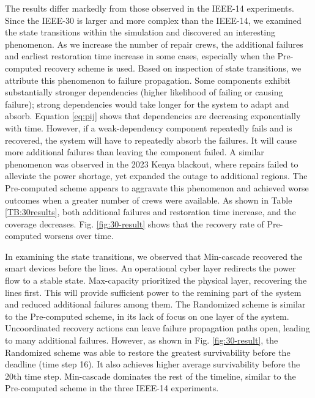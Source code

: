 \documentclass[conference]{IEEEtran}
\begin{document}
The results differ markedly from those observed in the IEEE-14 experiments. Since the IEEE-30 is larger and more complex than the IEEE-14, we examined the state transitions within the simulation and discovered an interesting phenomenon. As we increase the number of repair crews, the additional failures and earliest restoration time increase in some cases,  especially when the Pre-computed recovery scheme is used. Based on inspection of state transitions, we attribute this phenomenon to failure propagation. Some components exhibit substantially stronger dependencies (higher likelihood of failing or causing failure); strong dependencies would take longer for the system to adapt and absorb. Equation \ref{eq:pij} shows that dependencies are decreasing exponentially with time. However, if a weak-dependency component repeatedly fails and is recovered, the system will have to repeatedly absorb the failures. It will cause more additional failures than leaving the component failed. A similar phenomenon was observed in the 2023 Kenya blackout, where repairs failed to alleviate the power shortage, yet expanded the outage to additional regions. The Pre-computed scheme appears to aggravate this phenomenon and achieved worse outcomes when a greater number of crews were available. As shown in Table \ref{TB:30results}, both additional failures and restoration time increase, and the coverage decreases. Fig.  \ref{fig:30-result} shows that the recovery rate of Pre-computed  worsens over time. 


In examining the state transitions, we observed that Min-cascade recovered the smart devices before the lines. An operational cyber layer redirects the power flow to a stable state. Max-capacity prioritized the physical layer, recovering the lines first. This will provide sufficient power to the remining part of the system and reduced additional failures among them. The Randomized scheme is similar to the Pre-computed scheme, in its lack of focus on one layer of the system. Uncoordinated recovery actions can leave failure propagation paths open, leading to many additional failures. However, as shown in Fig.  \ref{fig:30-result}, the Randomized scheme was able to restore the greatest survivability before the deadline (time step 16). It also achieves higher average survivability before the 20th time step. Min-cascade dominates the rest of the timeline, similar to the Pre-computed scheme in the three IEEE-14 experiments. 
\end{document}
